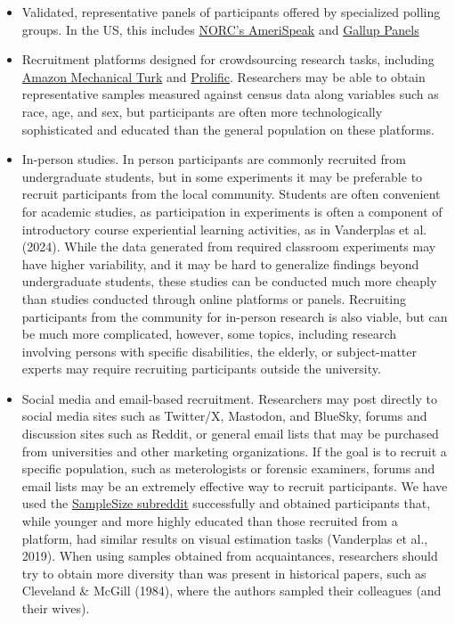 \documentclass[
  10pt,
  letterpaper,
  DIV=11,
  numbers=noendperiod]{scrartcl}
\begin{document}
\begin{itemize}
\item
  Validated, representative panels of participants offered by
  specialized polling groups. In the US, this includes
  \href{https://amerispeak.norc.org/us/en/amerispeak/about-amerispeak/panel-design.html}{NORC's
  AmeriSpeak} and
  \href{https://www.gallup.com/analytics/318911/us-social-research.aspx}{Gallup
  Panels}
\item
  Recruitment platforms designed for crowdsourcing research tasks,
  including \href{https://www.mturk.com/}{Amazon Mechanical Turk} and
  \href{https://www.prolific.com/}{Prolific}. Researchers may be able to
  obtain representative samples measured against census data along
  variables such as race, age, and sex, but participants are often more
  technologically sophisticated and educated than the general population
  on these platforms.
\item
  In-person studies. In person participants are commonly recruited from
  undergraduate students, but in some experiments it may be preferable
  to recruit participants from the local community. Students are often
  convenient for academic studies, as participation in experiments is
  often a component of introductory course experiential learning
  activities, as in Vanderplas et al. (2024). While the data generated
  from required classroom experiments may have higher variability, and
  it may be hard to generalize findings beyond undergraduate students,
  these studies can be conducted much more cheaply than studies
  conducted through online platforms or panels. Recruiting participants
  from the community for in-person research is also viable, but can be
  much more complicated, however, some topics, including research
  involving persons with specific disabilities, the elderly, or
  subject-matter experts may require recruiting participants outside the
  university.
\item
  Social media and email-based recruitment. Researchers may post
  directly to social media sites such as Twitter/X, Mastodon, and
  BlueSky, forums and discussion sites such as Reddit, or general email
  lists that may be purchased from universities and other marketing
  organizations. If the goal is to recruit a specific population, such
  as meterologists or forensic examiners, forums and email lists may be
  an extremely effective way to recruit participants. We have used the
  \href{https://web.archive.org/web/20250228110244/https://www.reddit.com/r/SampleSize/}{SampleSize
  subreddit} successfully and obtained participants that, while younger
  and more highly educated than those recruited from a platform, had
  similar results on visual estimation tasks (Vanderplas et al., 2019).
  When using samples obtained from acquaintances, researchers should try
  to obtain more diversity than was present in historical papers, such
  as Cleveland \& McGill (1984), where the authors sampled their
  colleagues (and their wives).
\end{itemize}
\end{document}
